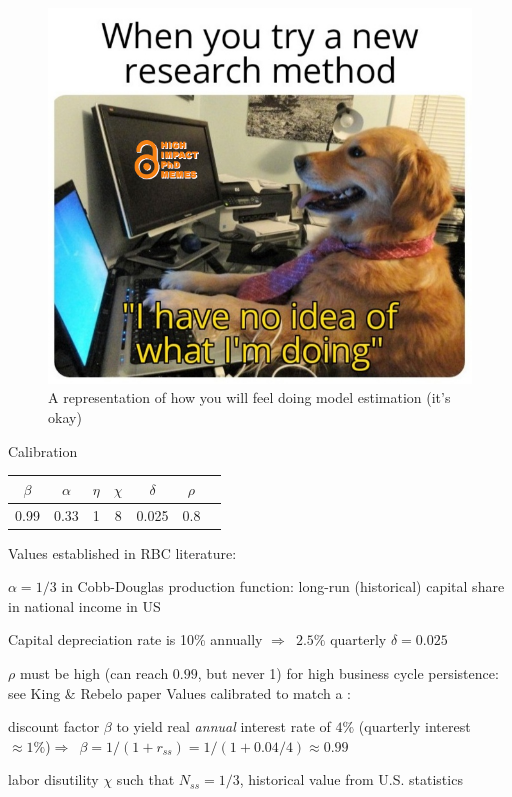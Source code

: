 \documentclass{beamer}
\newcommand{\tb}[1]{{\color{blue}{\textbf{#1}}}}
\newenvironment{mytemize}
{\vfill\itemize[nolistsep,itemsep=\fill,label=\color{blue}{$\triangleright$}]}
  {\enditemize}
\newcommand{\rarr}{$\Rightarrow$\ }
\begin{document}
\begin{frame}
  \begin{figure}[ht]
	\includegraphics[width = 0.8\linewidth]{FIGURES/new_method_meme.png}
	\centering
	\caption{A representation of how you will feel doing model estimation (it's okay)}
  \end{figure}
\end{frame}
\begin{frame}{Calibration}

\begin{center}

\begin{tabular}{c c c c c c c} 
\toprule
$\beta$ & $\alpha$ & $\eta$ & $\chi$ & $\delta$ & $\rho$ \\ 
\hline 
0.99 & 0.33 & 1 & 8 & 0.025 & 0.8 \\ 
\bottomrule
\end{tabular} 
\end{center}
\vfill
Values established in RBC literature:
\begin{mytemize}
\item  $\alpha=1/3$ in Cobb-Douglas production function: long-run (historical) capital share in national income in US
\item Capital depreciation rate is 10\% annually \rarr $2.5\%$ quarterly $\delta=0.025$
\item $\rho$ must be high (can reach $0.99$, but never 1) for high business cycle persistence: see King \& Rebelo paper
\end{mytemize}
\vfill
Values calibrated to match a \tb{target}:
\begin{mytemize}
\item discount factor $\beta$ to yield real \textit{annual} interest rate of $4\%$ (quarterly interest $\approx 1\%$)\rarr $\beta = 1/(1+r_{ss})=1/(1+0.04/4)\approx 0.99$ 
\item labor disutility $\chi$ such that $N_{ss} = 1/3$, historical value from U.S. statistics
\end{mytemize}

\end{frame}
\end{document}
